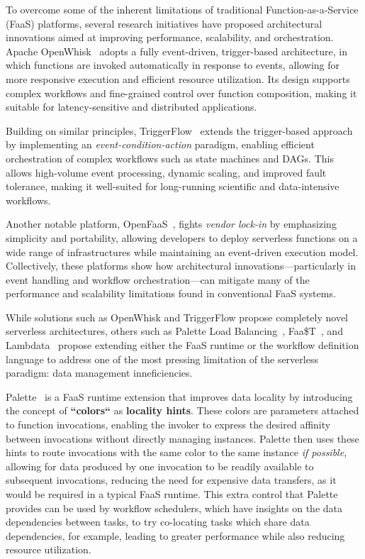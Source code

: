 To overcome some of the inherent limitations of traditional Function-as-a-Service (FaaS) platforms, several research initiatives have proposed architectural innovations aimed at improving performance, scalability, and orchestration. Apache OpenWhisk~\cite{open_whisk} adopts a fully event-driven, trigger-based architecture, in which functions are invoked automatically in response to events, allowing for more responsive execution and efficient resource utilization. Its design supports complex workflows and fine-grained control over function composition, making it suitable for latency-sensitive and distributed applications. 

Building on similar principles, TriggerFlow~\cite{triggerflow} extends the trigger-based approach by implementing an \textit{event-condition-action} paradigm, enabling efficient orchestration of complex workflows such as state machines and DAGs. This allows high-volume event processing, dynamic scaling, and improved fault tolerance, making it well-suited for long-running scientific and data-intensive workflows. 

Another notable platform, OpenFaaS~\cite{openfaas}, fights \textit{vendor lock-in} by emphasizing simplicity and portability, allowing developers to deploy serverless functions on a wide range of infrastructures while maintaining an event-driven execution model. Collectively, these platforms show how architectural innovations—particularly in event handling and workflow orchestration—can mitigate many of the performance and scalability limitations found in conventional FaaS systems.

While solutions such as OpenWhisk and TriggerFlow propose completely novel serverless architectures, others such as Palette Load Balancing~\cite{palette_load_balancing}, Faa\$T~\cite{faast_caching}, and Lambdata~\cite{lambdata_intents} propose extending either the FaaS runtime or the workflow definition language to address one of the most pressing limitation of the serverless paradigm: data management inneficiencies.

Palette~\cite{palette_load_balancing} is a FaaS runtime extension that improves data locality by introducing the concept of \textbf{``colors``} as \textbf{locality hints}. These colors are parameters attached to function invocations, enabling the invoker to express the desired affinity between invocations without directly managing instances. Palette then uses these hints to route invocations with the same color to the same instance \textit{if possible}, allowing for data produced by one invocation to be readily available to subsequent invocations, reducing the need for expensive data transfers, as it would be required in a typical FaaS runtime. This extra control that Palette provides can be used by workflow schedulers, which have insights on the data dependencies between tasks, to try co-locating tasks which share data dependencies, for example, leading to greater performance while also reducing resource utilization.

